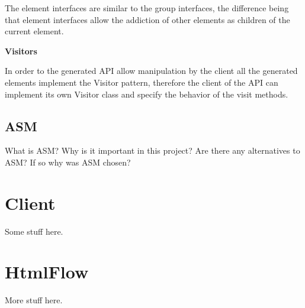 The element interfaces are similar to the group interfaces, the difference being that element interfaces allow the addiction of other elements as children of the current element. 

\textbf{Visitors}

In order to the generated API allow manipulation by the client all the generated elements implement the Visitor pattern, therefore the client of the API can implement its own Visitor class and specify the behavior of the visit methods.

\subsection{ASM} %
\label{sec:asm}

What is ASM? Why is it important in this project? Are there any alternatives to ASM? If so why was ASM chosen?

\section{Client} %
\label{sec:client}

Some stuff here.

\section{HtmlFlow}
\label{sec:htmlflow}

More stuff here.
